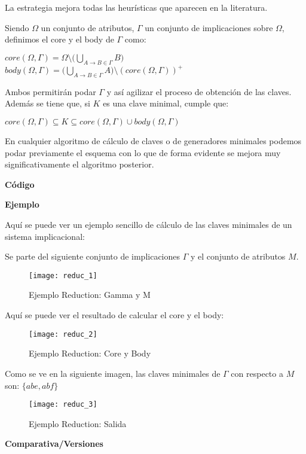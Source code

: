 La estrategia mejora todas las heur\'isticas que aparecen en la literatura. 

Siendo \(\Omega\) un conjunto de atributos, \(\Gamma\) un conjunto de implicaciones sobre \(\Omega\), definimos el core y el body de \(\Gamma\) como:
\begin{center}
    \(core(\Omega,\Gamma) = \Omega \setminus \Big(\bigcup_{A \to B \in \Gamma} B\Big) \ \ \ \ \)
    \(body(\Omega,\Gamma) = \Big(\bigcup_{A \to B \in \Gamma} A\Big) \setminus (core(\Omega,\Gamma))^+\)
\end{center}
Ambos permitir\'an podar \(\Gamma\) y as\'i agilizar el proceso de obtenci\'on de las claves. Adem\'as se tiene que, si \(K\) es una clave minimal, cumple que: 
\begin{center}
    \(core(\Omega,\Gamma) \subseteq K \subseteq core(\Omega,\Gamma) \cup body(\Omega,\Gamma)\)
\end{center}

En cualquier algoritmo de c\'alculo de claves o de generadores minimales podemos podar previamente el esquema con lo que de forma evidente se mejora muy significativamente el algoritmo posterior.

\newpage
\textbf{C\'odigo} 

\newpage


\newpage
\textbf{Ejemplo} 

Aqu\'i se puede ver un ejemplo sencillo de c\'alculo de las claves minimales de un sistema implicacional:

Se parte del siguiente conjunto de implicaciones \(\Gamma\) y el conjunto de atributos \(M\).
\begin{figure}[H]
    \centering
    \texttt{[image: reduc\_1]}
    \caption{Ejemplo Reduction: Gamma y M}
    \label{fig:reduc_1}
\end{figure}
Aqu\'i se puede ver el resultado de calcular el core y el body:
\begin{figure}[H]
    \centering
    \texttt{[image: reduc\_2]}
    \caption{Ejemplo Reduction: Core y Body}
    \label{fig:reduc_2}
\end{figure}
Como se ve en la siguiente imagen, las claves minimales de \(\Gamma\) con respecto a \(M\) son: \(\{abe,abf\}\)
\begin{figure}[H]
    \centering
    \texttt{[image: reduc\_3]}
    \caption{Ejemplo Reduction: Salida}
    \label{fig:reduc_3}
\end{figure}
\newpage
\textbf{Comparativa/Versiones} 

